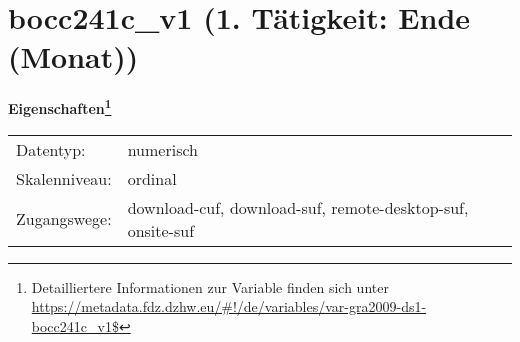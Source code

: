 
    \setcounter{footnote}{0}

    \vspace*{-1.8cm}
	\section{bocc241c\_v1 (1. Tätigkeit: Ende (Monat))}
	\label{section:bocc241c_v1}



    \vspace*{0.5cm}
    \noindent\textbf{Eigenschaften\footnote{Detailliertere Informationen zur Variable finden sich unter
		\url{https://metadata.fdz.dzhw.eu/\#!/de/variables/var-gra2009-ds1-bocc241c_v1$}}}\\
	\begin{tabularx}{\hsize}{@{}lX}
	Datentyp: & numerisch \\
	Skalenniveau: & ordinal \\
	Zugangswege: &
	  download-cuf, 
	  download-suf, 
	  remote-desktop-suf, 
	  onsite-suf
 \\
    \end{tabularx}




